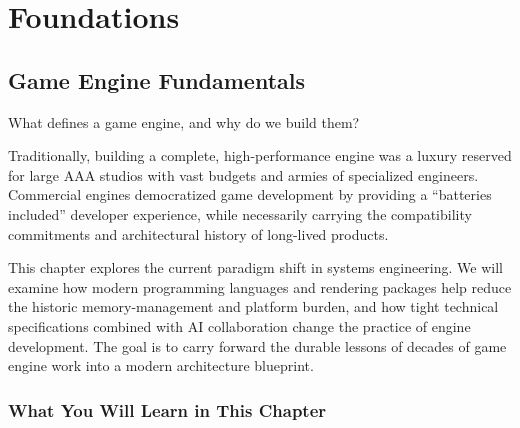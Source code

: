 \documentclass[
  11pt,
  letterpaper,
  DIV=11,
  numbers=noendperiod,
  twoside,
  open=right]{scrreprt}
\begin{document}
\part{Foundations}

\chapter{Game Engine Fundamentals}\label{game-engine-fundamentals}

What defines a game engine, and why do we build them?

Traditionally, building a complete, high-performance engine was a luxury
reserved for large AAA studios with vast budgets and armies of
specialized engineers. Commercial engines democratized game development
by providing a ``batteries included'' developer experience, while
necessarily carrying the compatibility commitments and architectural
history of long-lived products.

This chapter explores the current paradigm shift in systems engineering.
We will examine how modern programming languages and rendering packages
help reduce the historic memory-management and platform burden, and how
tight technical specifications combined with AI collaboration change the
practice of engine development. The goal is to carry forward the durable
lessons of decades of game engine work into a modern architecture
blueprint.

\section*{What You Will Learn in This
Chapter}\label{what-you-will-learn-in-this-chapter}

\end{document}
